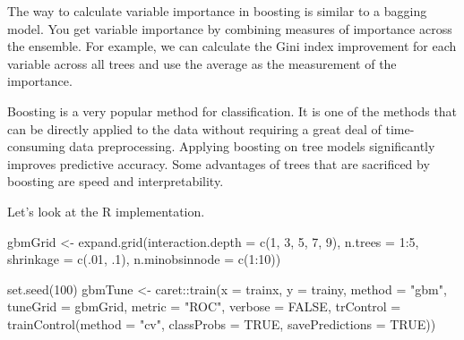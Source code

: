 \documentclass[
  12pt,
]{krantz}
\makeatletter
\newenvironment{Shaded}{\begin{snugshade}}{\end{snugshade}}
\newcommand{\AttributeTok}[1]{\textcolor[rgb]{0.61,0.61,0.61}{#1}}
\newcommand{\ConstantTok}[1]{\textcolor[rgb]{0,0,0}{#1}}
\newcommand{\DecValTok}[1]{\textcolor[rgb]{0.06,0.06,0.06}{#1}}
\newcommand{\FunctionTok}[1]{\textcolor[rgb]{0,0,0}{#1}}
\newcommand{\NormalTok}[1]{#1}
\newcommand{\OtherTok}[1]{\textcolor[rgb]{0.37,0.37,0.37}{#1}}
\newcommand{\SpecialCharTok}[1]{\textcolor[rgb]{0,0,0}{#1}}
\newcommand{\StringTok}[1]{\textcolor[rgb]{0.5,0.5,0.5}{#1}}
\newenvironment{kframe}{%
\medskip{}
\setlength{\fboxsep}{.8em}
 \def\at@end@of@kframe{}%
 \ifinner\ifhmode%
  \def\at@end@of@kframe{\end{minipage}}%
  \begin{minipage}{\columnwidth}%
 \fi\fi%
 \def\FrameCommand##1{\hskip\@totalleftmargin \hskip-\fboxsep
 \colorbox{shadecolor}{##1}\hskip-\fboxsep
     \hskip-\linewidth \hskip-\@totalleftmargin \hskip\columnwidth}%
 \MakeFramed {\advance\hsize-\width
   \@totalleftmargin\z@ \linewidth\hsize
   \@setminipage}}%
 {\par\unskip\endMakeFramed%
 \at@end@of@kframe}
\renewenvironment{Shaded}{\begin{kframe}}{\end{kframe}}
\makeatother
\begin{document}
The way to calculate variable importance in boosting is similar to a bagging model. You get variable importance by combining measures of importance across the ensemble. For example, we can calculate the Gini index improvement for each variable across all trees and use the average as the measurement of the importance.

Boosting is a very popular method for classification. It is one of the methods that can be directly applied to the data without requiring a great deal of time-consuming data preprocessing. Applying boosting on tree models significantly improves predictive accuracy. Some advantages of trees that are sacrificed by boosting are speed and interpretability.

Let's look at the R implementation.

\begin{Shaded}
\begin{Highlighting}[]
\NormalTok{gbmGrid }\OtherTok{\textless{}{-}} \FunctionTok{expand.grid}\NormalTok{(}\AttributeTok{interaction.depth =} \FunctionTok{c}\NormalTok{(}\DecValTok{1}\NormalTok{, }\DecValTok{3}\NormalTok{, }\DecValTok{5}\NormalTok{, }\DecValTok{7}\NormalTok{, }\DecValTok{9}\NormalTok{),}
                       \AttributeTok{n.trees =} \DecValTok{1}\SpecialCharTok{:}\DecValTok{5}\NormalTok{,}
                       \AttributeTok{shrinkage =} \FunctionTok{c}\NormalTok{(.}\DecValTok{01}\NormalTok{, .}\DecValTok{1}\NormalTok{),}
                       \AttributeTok{n.minobsinnode =} \FunctionTok{c}\NormalTok{(}\DecValTok{1}\SpecialCharTok{:}\DecValTok{10}\NormalTok{))}

\FunctionTok{set.seed}\NormalTok{(}\DecValTok{100}\NormalTok{)}
\NormalTok{gbmTune }\OtherTok{\textless{}{-}}\NormalTok{ caret}\SpecialCharTok{::}\FunctionTok{train}\NormalTok{(}\AttributeTok{x =}\NormalTok{ trainx, }
                \AttributeTok{y =}\NormalTok{ trainy,}
                \AttributeTok{method =} \StringTok{"gbm"}\NormalTok{,}
                \AttributeTok{tuneGrid =}\NormalTok{ gbmGrid,}
                \AttributeTok{metric =} \StringTok{"ROC"}\NormalTok{,}
                \AttributeTok{verbose =} \ConstantTok{FALSE}\NormalTok{,}
                \AttributeTok{trControl =} \FunctionTok{trainControl}\NormalTok{(}\AttributeTok{method =} \StringTok{"cv"}\NormalTok{,}
                           \AttributeTok{classProbs =} \ConstantTok{TRUE}\NormalTok{,}
                           \AttributeTok{savePredictions =} \ConstantTok{TRUE}\NormalTok{))}
\end{Highlighting}
\end{Shaded}
\end{document}
